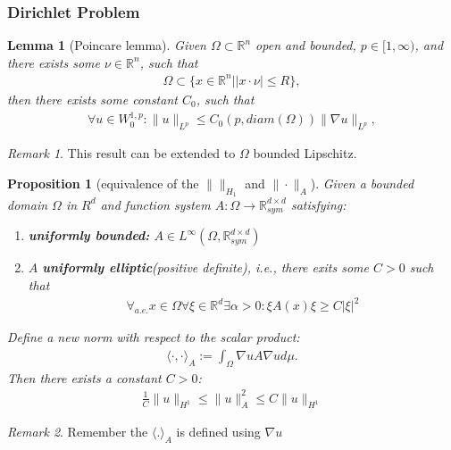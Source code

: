 \documentclass[a4paper,11pt,oneside,fleqn]{book}
\newtheorem{lemma}[theorem]{Lemma}
\newtheorem{proposition}[theorem]{Proposition}
\theoremstyle{definition}
\theoremstyle{remark}
\newtheorem*{remark}{Remark}
\begin{document}
\subsubsection{Dirichlet Problem}
\begin{lemma}[Poincare lemma]
Given $\Omega \subset \mathbb{R}^n$ open and bounded, $p \in [1, \infty)$, and there exists some $\nu \in \mathbb{R}^n$, such that 
\begin{align*}
	\Omega \subset \{x \in \mathbb{R}^n| |x \cdot \nu| \le R\},
\end{align*}
then there exists some constant $C_0$, such that
\begin{align*}
	\forall u \in W_0^{1,p}: \|u\|_{L^p} \leq C_0(p, diam(\Omega)) \|\nabla u\|_{L^p},
\end{align*}
\end{lemma}
\begin{remark}
This result can be extended to $\Omega$ bounded Lipschitz. 	
\end{remark}


\begin{proposition}[equivalence of the $\|\|_{H_1}$ and $\|\cdot\|_{A}$]
	Given a bounded domain $\Omega$ in $R^d$ and function system $A : \Omega \rightarrow \mathbb{R}^{d \times d}_{sym}$ satisfying:
	\begin{enumerate}
		\item \textbf{uniformly bounded: }$A \in L^\infty(\Omega, \mathbb{R}^{d \times d}_{sym})$
		\item $A$ \textbf{uniformly elliptic}(positive definite), i.e., there exits some $C > 0$ such that
		\begin{align*}
			\forall_{a.e.} x \in \Omega \forall \xi \in \mathbb{R}^d \exists \alpha >0 : 
			\xi A(x)\xi \geq C|\xi|^2
		\end{align*}
	\end{enumerate}
	Define a new norm with respect to the scalar product:
	\begin{align*}
		\langle \cdot , \cdot \rangle_A:= \int_\Omega \nabla u A \nabla u d\mu.
	\end{align*}
	Then there exists a constant $C > 0$:
	\begin{align*}
		\frac{1}{C} \|u\|_{H^1} \leq \|u\|_A^2 \leq C \|u\|_{H^1} 
	\end{align*}
\end{proposition}
\begin{remark}
Remember the $\langle .\rangle_A$ is defined using $\nabla u$	
\end{remark}
\end{document}
